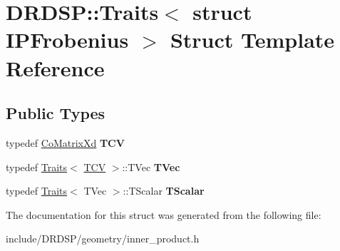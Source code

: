\hypertarget{struct_d_r_d_s_p_1_1_traits_3_01struct_01_i_p_frobenius_01_4}{\section{D\-R\-D\-S\-P\-:\-:Traits$<$ struct I\-P\-Frobenius $>$ Struct Template Reference}
\label{struct_d_r_d_s_p_1_1_traits_3_01struct_01_i_p_frobenius_01_4}
}
\subsection*{Public Types}
\begin{DoxyCompactItemize}
\item 
\hypertarget{struct_d_r_d_s_p_1_1_traits_3_01struct_01_i_p_frobenius_01_4_aa2dc7d64d9cb681fa92250cbb1dc81c2}{typedef \hyperlink{struct_d_r_d_s_p_1_1_co_matrix_xd}{Co\-Matrix\-Xd} {\bfseries T\-C\-V}}\label{struct_d_r_d_s_p_1_1_traits_3_01struct_01_i_p_frobenius_01_4_aa2dc7d64d9cb681fa92250cbb1dc81c2}

\item 
\hypertarget{struct_d_r_d_s_p_1_1_traits_3_01struct_01_i_p_frobenius_01_4_a406d1575c5f00fa20c68393270f154b8}{typedef \hyperlink{struct_d_r_d_s_p_1_1_traits}{Traits}$<$ \hyperlink{struct_d_r_d_s_p_1_1_co_matrix_xd}{T\-C\-V} $>$\-::T\-Vec {\bfseries T\-Vec}}\label{struct_d_r_d_s_p_1_1_traits_3_01struct_01_i_p_frobenius_01_4_a406d1575c5f00fa20c68393270f154b8}

\item 
\hypertarget{struct_d_r_d_s_p_1_1_traits_3_01struct_01_i_p_frobenius_01_4_a745fb704d12a2e95ba4c24b359e765e9}{typedef \hyperlink{struct_d_r_d_s_p_1_1_traits}{Traits}$<$ T\-Vec $>$\-::T\-Scalar {\bfseries T\-Scalar}}\label{struct_d_r_d_s_p_1_1_traits_3_01struct_01_i_p_frobenius_01_4_a745fb704d12a2e95ba4c24b359e765e9}

\end{DoxyCompactItemize}


The documentation for this struct was generated from the following file\-:\begin{DoxyCompactItemize}
\item 
include/\-D\-R\-D\-S\-P/geometry/inner\-\_\-product.\-h\end{DoxyCompactItemize}
